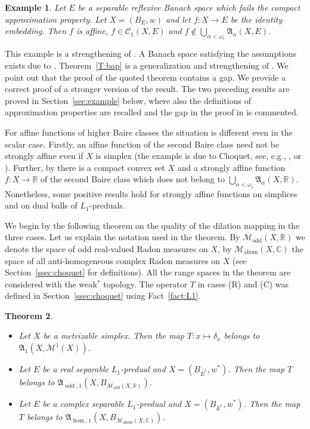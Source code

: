 \documentclass{amsart}
\numberwithin{equation}{section}
\newtheorem{thm}{Theorem}[section]
\newtheorem{example}[thm]{Example}
\theoremstyle{definition}
\def\fra{\mathfrak{A}}
\def\C{\mathcal C}
\def\M{\mathcal M}
\def\ce{\mathbb C}
\def\er{\mathbb R}
\def\hom{\operatorname{hom}}
\def\ahom{\operatorname{ahom}}
\def\odd{\operatorname{odd}}
\begin{document}
\begin{example}\label{E:cap}
Let $E$ be a separable reflexive Banach space which fails the compact approximation property. Let $X=(B_E,w)$ and let $f:X\to E$ be the identity embedding. Then $f$ is affine, $f\in\C_1(X,E)$ and 
	 $f\notin\bigcup_{\alpha<\omega_1} \fra_\alpha(X,E)$.
\end{example}

This example is a strengthening of \cite[Example 2.22]{MeSta}. A Banach space satisfying the assumptions exists due to  \cite[Proposition~2.12]{casazza}.  Theorem~\ref{T:bap} is a generalization and strengthening of \cite[Theorem 2.12]{MeSta}.
We point out that the proof of the quoted theorem contains a gap. We provide a correct proof of a stronger version of the result. The two preceding results are proved in Section~\ref{sec:example} below, where also the definitions of approximation properties are recalled and the gap in the proof in \cite{MeSta} is commented.

For affine functions of higher Baire classes the situation is different even in the scalar case. Firstly, an affine function of the second Baire class need not be strongly affine even if $X$ is simplex (the example is due to Choquet, see, e.g., \cite[Example~I.2.10]{alfsen}, \cite[Section 14]{phelps-choquet} or \cite[Proposition 2.63]{lmns}). Further, by \cite{talagrand} there is a compact convex set $X$ and a strongly affine function $f:X\to\er$ of the second Baire class which does not belong to $\bigcup_{\alpha<\omega_1} \fra_\alpha(X,\er)$.
Nonetheless, some positive results hold for strongly affine functions on simplices and on dual balls of $L_1$-preduals.

We begin by the following theorem on the quality of the dilation mapping in the three cases. Let us explain the notation used in the theorem. By $\M_{\odd}(X,\er)$ we denote the space of odd real-valued Radon measures on $X$, by ${\M_{\ahom}(X,\ce)}$ the space of all anti-homogeneous complex Radon measures on $X$ (see Section~\ref{ssec:choquet} for definitions). All the range spaces in the theorem are considered with the weak$^*$ topology. 
The operator $T$ in cases (R) and (C) was defined in Section~\ref{ssec:choquet} using Fact~\ref{fact:L1}.


\begin{thm}\label{T:dilation}\
\begin{itemize}
	\item[(S)] Let $X$ be a metrizable simplex. Then the map $T:x\mapsto \delta_x$ belongs to $\fra_1(X,\M^1(X))$.
	\item[(R)] Let $E$ be a real separable $L_1$-predual and $X=(B_{E^*},w^*)$. Then the map $T$ belongs to $\fra_{\odd,1}(X,B_{\M_{\odd}(X,\er)})$.
	\item[(C)] Let $E$ be a complex separable $L_1$-predual and $X=(B_{E^*},w^*)$. Then the map $T$ belongs to $\fra_{\hom,1}(X,B_{\M_{\ahom}(X,\ce)})$.
\end{itemize}
\end{thm}
\end{document}
